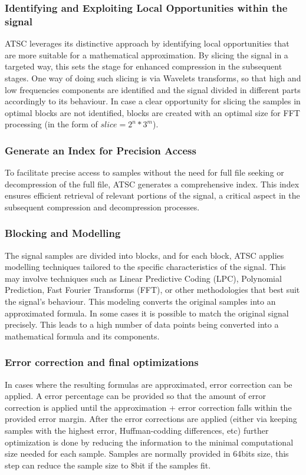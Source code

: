 \documentclass[conference]{IEEEtran}
\begin{document}
\vspace{10pt}
\subsubsection{Identifying and Exploiting Local Opportunities within the signal}
ATSC leverages its distinctive approach by identifying local opportunities that are more suitable for a mathematical approximation. By slicing the signal in a targeted way, this sets the stage for enhanced compression in the subsequent stages. One way of doing such slicing is via Wavelets transforms, so that high and low frequencies components are identified and the signal divided in different parts accordingly to its behaviour.
In case a clear opportunity for slicing the samples in optimal blocks are not identified, blocks are created with an optimal size for FFT processing (in the form of $slice = 2^n * 3^m$).

\vspace{10pt}
\subsubsection{Generate an Index for Precision Access}
To facilitate precise access to samples without the need for full file seeking or decompression of the full file, ATSC generates a comprehensive index. This index ensures efficient retrieval of relevant portions of the signal, a critical aspect in the subsequent compression and decompression processes.

\vspace{10pt}
\subsubsection{Blocking and Modelling}
The signal samples are divided into blocks, and for each block, ATSC applies modelling techniques tailored to the specific characteristics of the signal. This may involve techniques such as Linear Predictive Coding (LPC), Polynomial Prediction, Fast Fourier Transforms (FFT), or other methodologies that best suit the signal's behaviour. This modeling converts the original samples into an approximated formula. In some cases it is possible to match the original signal precisely. This leads to a high number of data points being converted into a mathematical formula and its components.

\vspace{10pt}
\subsubsection{Error correction and final optimizations}
In cases where the resulting formulas are approximated, error correction can be applied. A error percentage can be provided so that the amount of error correction is applied until the approximation + error correction falls within the provided error margin. After the error corrections are applied (either via keeping samples with the highest error, Huffman-codding differences, etc) further optimization is done by reducing the information to the minimal computational size needed for each sample. Samples are normally provided in 64bits size, this step can reduce the sample size to 8bit if the samples fit.
\end{document}
